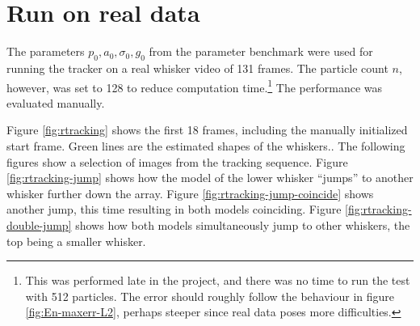 \section{Run on real data}

The parameters $p_0, a_0, \sigma_0, g_0$ from the parameter benchmark
were used for running the tracker on a real whisker video of 131
frames. The particle count $n$, however, was set to 128 to reduce
computation time.\footnote{This was performed late in the project, and
  there was no time to run the test with 512 particles. The error
  should roughly follow the behaviour in figure \ref{fig:En-maxerr-L2},
  perhaps steeper since real data poses more difficulties.} The
performance was evaluated manually.

Figure \ref{fig:rtracking} shows the first 18 frames, including the
manually initialized start frame. Green lines are the estimated shapes
of the whiskers.. The following figures show a selection of images
from the tracking sequence. Figure \ref{fig:rtracking-jump} shows how
the model of the lower whisker ``jumps'' to another whisker further
down the array. Figure \ref{fig:rtracking-jump-coincide} shows another
jump, this time resulting in both models coinciding. Figure
\ref{fig:rtracking-double-jump} shows how both models
simultaneously jump to other whiskers, the top being a smaller whisker.

